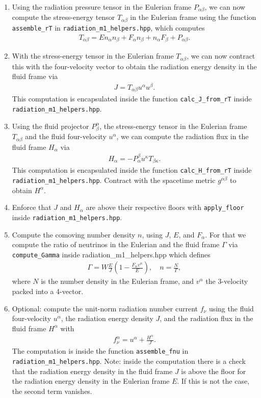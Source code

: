 \documentclass{article}
\newcommand{\var}[1]{%
  {\setlength{\fboxsep}{1.5pt}%
   \colorbox{varbg}{\textcolor{varfg}{\texttt{\small #1}}}}}
\begin{document}
\begin{enumerate}
\begin{align}
  \end{align}
  \item Using the radiation pressure tensor in the Eulerian frame $P_{\alpha\beta}$, we can now compute the stress-energy tensor
  $T_{\alpha\beta}$ in the Eulerian frame using the function \var{assemble\_rT} in \var{radiation\_m1\_helpers.hpp}, which computes
  \begin{align}
    T_{\alpha\beta}=En_{\alpha}n_{\beta}+F_{\alpha}n_{\beta}+n_{\alpha}F_{\beta}+P_{\alpha\beta}.\nonumber
  \end{align}
  \item With the stress-energy tensor in the Eulerian frame $T_{\alpha\beta}$, we can now contract this with the four-velocity vector
  to obtain the radiation energy density in the fluid frame via
  \begin{align}
    \boxed{J=T_{\alpha\beta}u^{\alpha}u^{\beta}}.
  \end{align}
  This computation is encapsulated inside the function \var{calc\_J\_from\_rT} inside \var{radiation\_m1\_helpers.hpp}.
  \item Using the fluid projector $P^{\alpha}_{\beta}$, the stress-energy tensor in the Eulerian frame $T_{\alpha\beta}$ and
  the fluid four-velocity $u^{\alpha}$, we can compute the radiation flux in the fluid frame $H_{\alpha}$ via
  \begin{align}
    \boxed{H_{\alpha}=-P^{\beta}_{\alpha}u^{\kappa}T_{\beta\kappa}}.
  \end{align}
  This computation is encapsulated inside the function \var{calc\_H\_from\_rT} inside \var{radiation\_m1\_helpers.hpp}.
  Contract with the spacetime metric $g^{\alpha\beta}$ to obtain $H^{\alpha}$.
  \item Enforce that $J$ and $H_{\alpha}$ are above their respective floors with \var{apply\_floor} inside \var{radiation\_m1\_helpers.hpp}.
  \item Compute the comoving number density $n$, using $J$, $E$, and $F_{\alpha}$. For that we compute the ratio of neutrinos in the Eulerian and
  the fluid frame $\Gamma$ via \var{compute\_Gamma} inside {radiation\_m1\_helpers.hpp} which defines
  \begin{align}
    \Gamma=W\frac{E}{J}(1-\frac{F_{\alpha}v^{\alpha}}{E}),\quad \boxed{n=\frac{N}{\Gamma}},
  \end{align}
  where $N$ is the number density in the Eulerian frame, and $v^{\alpha}$ the 3-velocity packed into a 4-vector.
  \item Optional: compute the unit-norm radiation number current $f_{\nu}$ using the fluid four-velocity $u^{\alpha}$,
  the radiation energy density $J$, and the radiation flux in the fluid frame $H^{\alpha}$ with
  \begin{align}
    \boxed{f_{\nu}^{\alpha}=u^{\alpha}+\frac{H^{\alpha}}{J}}.
  \end{align}
  The computation is inside the function \var{assemble\_fnu} in \var{radiation\_m1\_helpers.hpp}. Note: inside the computation there is
  a check that the radiation energy density in the fluid frame $J$ is above the floor for the radiation energy density in the Eulerian frame $E$. If this is
  not the case, the second term vanishes.
\end{enumerate}
\end{document}
